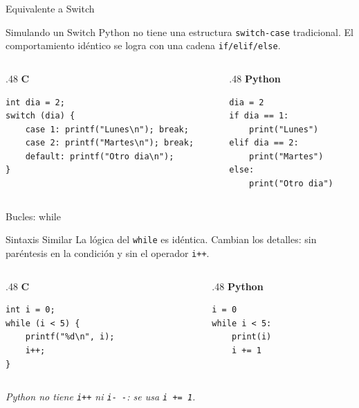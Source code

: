 \documentclass{beamer}
\begin{document}
\begin{frame}[fragile]{Equivalente a Switch}
  \begin{block}{Simulando un Switch}
      Python no tiene una estructura \texttt{switch-case} tradicional. El comportamiento idéntico se logra con una cadena \texttt{if/elif/else}.
  \end{block}

  \begin{columns}[T]
    \begin{column}{.48\textwidth}
      \centering\textbf{C}
      \begin{verbatim}
int dia = 2;
switch (dia) {
    case 1: printf("Lunes\n"); break;
    case 2: printf("Martes\n"); break;
    default: printf("Otro dia\n");
}
      \end{verbatim}
    \end{column}
    \begin{column}{.48\textwidth}
      \centering\textbf{Python}
      \begin{verbatim}
dia = 2
if dia == 1:
    print("Lunes")
elif dia == 2:
    print("Martes")
else:
    print("Otro dia")
      \end{verbatim}
    \end{column}
  \end{columns}
\end{frame}

\begin{frame}[fragile]{Bucles: while}
  \begin{block}{Sintaxis Similar}
    La lógica del \texttt{while} es idéntica. Cambian los detalles: sin paréntesis en la condición y sin el operador \texttt{i++}.
  \end{block}
  \begin{columns}[T]
    \begin{column}{.48\textwidth}
      \centering\textbf{C}
      \begin{verbatim}
int i = 0;
while (i < 5) {
    printf("%d\n", i);
    i++;
}
      \end{verbatim}
    \end{column}
    \begin{column}{.48\textwidth}
      \centering\textbf{Python}
      \begin{verbatim}
i = 0
while i < 5:
    print(i)
    i += 1
      \end{verbatim}
    \end{column}
  \end{columns}
  \vspace{0.3em}
  \small \textit{Python no tiene \texttt{i++} ni \texttt{i- -}: se usa \texttt{i += 1}.}
\end{frame}
\end{document}
